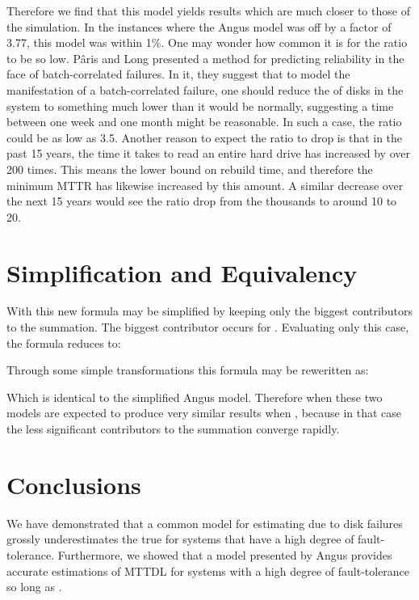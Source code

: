\documentclass[XXX,endnotes]{usetex-v1}
\begin{document}
Therefore we find that this model yields results which are much closer to those of the simulation.  In the instances where the Angus model was off by a factor of 3.77, this model was within 1\%.  One may wonder how common it is for the  ratio to be so low.  P\^aris and Long presented a method for predicting reliability in the face of batch-correlated failures\cite{correlations}.  In it, they suggest that to model the manifestation of a batch-correlated failure, one should reduce the  of disks in the system to something much lower than it would be normally, suggesting a time between one week and one month might be reasonable.  In such a case, the  ratio could be as low as 3.5.  Another reason to expect the ratio to drop is that in the past 15 years, the time it takes to read an entire hard drive has increased by over 200 times.  This means the lower bound on rebuild time, and therefore the minimum MTTR has likewise increased by this amount.  A similar decrease over the next 15 years would see the ratio drop from the thousands to around 10 to 20.

\section{Simplification and Equivalency}

With  this new formula may be simplified by keeping only the biggest contributors to the summation.  The biggest contributor occurs for .  Evaluating only this case, the formula reduces to:

 

Through some simple transformations this formula may be reweritten as:



Which is identical to the simplified Angus model.  Therefore when these two models are expected to produce very similar results when , because in that case the less significant contributors to the summation converge rapidly.

\section{Conclusions}

We have demonstrated that a common model for estimating  due to disk failures grossly underestimates the true  for systems that have a high degree of fault-tolerance.  Furthermore, we showed that a model presented by Angus provides accurate estimations of MTTDL for systems with a high degree of fault-tolerance so long as .
\end{document}
